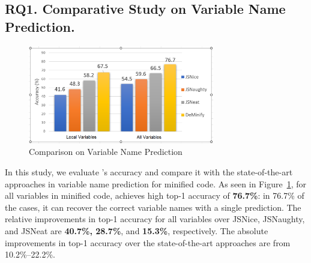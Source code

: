 \subsection{{\bf RQ1. Comparative Study on Variable Name Prediction.}}
\label{empirical-rq1}


\begin{figure}[thbp]
\begin{center}
\includegraphics[width=3.2in]{figures/name-prediction-result}
\vspace{-8pt}
\caption{Comparison on Variable Name Prediction}
\label{name-prediction-result}
\end{center}
\end{figure}

In this study, we evaluate {\tool}'s accuracy and compare it with the
state-of-the-art approaches in variable name prediction for minified
code.
As seen in Figure~\ref{name-prediction-result}, for all variables in
minified code, {\tool} achieves high top-1 accuracy of {\bf 76.7\%}:
in 76.7\% of the cases, it can recover the correct variable names with
a single prediction. The relative improvements in top-1 accuracy for
all variables over JSNice, JSNaughty, and JSNeat are {\bf 40.7\%,
  28.7\%}, and {\bf 15.3\%}, respectively. The absolute improvements
in top-1 accuracy over the state-of-the-art approaches are from
10.2\%--22.2\%.

